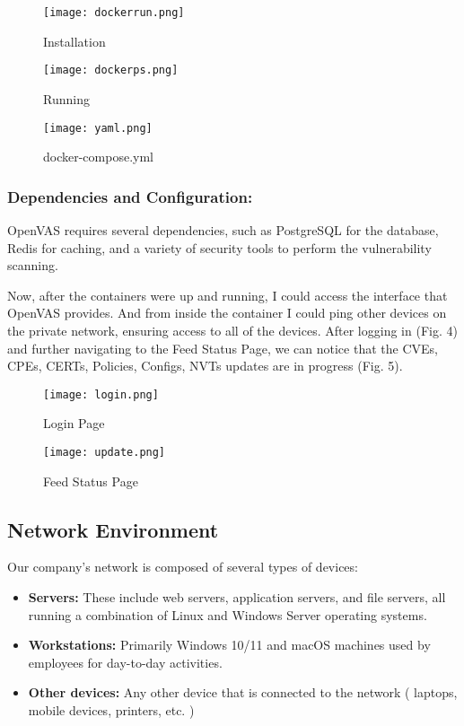 \documentclass[twocolumn]{article}
\begin{document}
\begin{figure}[h!]
    \centering
    \texttt{[image: dockerrun.png]}
    \caption{Installation}
\end{figure}

\begin{figure}[h!]
    \centering
    \texttt{[image: dockerps.png]}
    \caption{Running}
\end{figure}

\begin{figure}[h!]
    \centering
    \texttt{[image: yaml.png]}
    \caption{docker-compose.yml}
\end{figure}

\subsubsection{Dependencies and Configuration:}

OpenVAS requires several dependencies, such as PostgreSQL for the database, Redis for caching, and a variety of security tools to perform the vulnerability scanning.

Now, after the containers were up and running, I could access the interface that OpenVAS provides. And from inside the container I could ping other devices on the private network, ensuring access to all of the devices. After logging in (Fig. 4) and further navigating to the Feed Status Page, we can notice that the CVEs, CPEs, CERTs, Policies, Configs, NVTs updates are in progress (Fig. 5). 

\begin{figure}[h!]
    \centering
    \texttt{[image: login.png]}
    \caption{Login Page}
\end{figure}

\begin{figure}[h!]
    \centering
    \texttt{[image: update.png]}
    \caption{Feed Status Page}
\end{figure}

\subsection{Network Environment}

Our company’s network is composed of several types of devices:

\begin{itemize}
    \item \textbf{Servers:} These include web servers, application servers, and file servers, all running a combination of Linux and Windows Server operating systems.
    \item \textbf{Workstations:} Primarily Windows 10/11 and macOS machines used by employees for day-to-day activities.
    \item \textbf{Other devices:} Any other device that is connected to the network ( laptops, mobile devices, printers, etc. )
\end{itemize}
\end{document}
